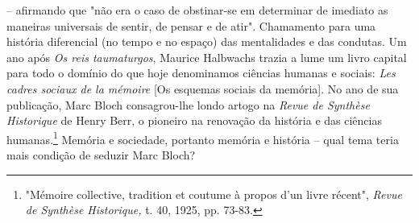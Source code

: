 \documentclass[a5paper]{book}
\begin{document}
-- afirmando que "não era o caso de obstinar-se em determinar de imediato as maneiras universais de sentir, de pensar e de atir". Chamamento para uma história diferencial (no tempo e no espaço) das mentalidades e das condutas. Um ano após \textit{Os reis taumaturgos}, Maurice Halbwachs trazia a lume um livro capital para todo o domínio do que hoje denominamos ciências humanas e sociais: \textit{Les cadres sociaux de la mémoire} [Os esquemas sociais da memória]. No ano de sua publicação, Marc Bloch consagrou-lhe londo artogo na \textit{Revue de Synthèse Historique} de Henry Berr, o pioneiro na renovação da história e das ciências humanas.\footnote{"Mémoire collective, tradition et coutume à propos d'un livre récent", \textit{Revue de Synthèse Historique,} t. 40, 1925, pp. 73-83.} Memória e sociedade, portanto memória e história -- qual tema teria mais condição de seduzir Marc Bloch?
\end{document}
